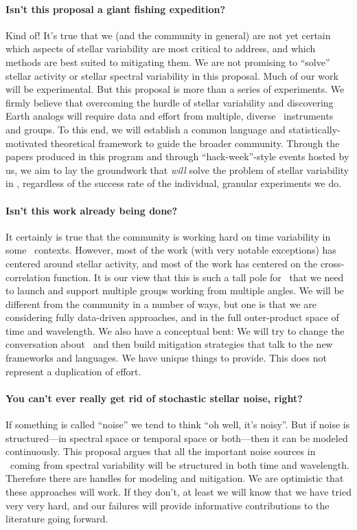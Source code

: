 \documentclass[12pt, letterpaper]{article}
\begin{document}
\paragraph{Isn't this proposal a giant fishing expedition?}
Kind of! It's true that we (and the community in general) are not yet certain 
which aspects of stellar variability are most critical to address, and which 
methods are best suited to mitigating them. We are not promising to 
``solve'' stellar activity or stellar spectral variability in this proposal.
Much of our work will be 
experimental. But this proposal is more than a series of experiments. 
We firmly believe that overcoming the hurdle of stellar variability and 
discovering Earth analogs will require data and effort from multiple, 
diverse \EPRV\ instruments and groups. To this end, we will establish 
a common language and statistically-motivated theoretical framework 
to guide the broader community. Through the papers produced in this 
program and through ``hack-week''-style events hosted by us, we aim to 
lay the groundwork that \textit{will} solve the problem of stellar variability 
in \EPRV, regardless of the success rate of the individual, granular experiments we do. 


\paragraph{Isn't this work already being done?}
It certainly is true that the community is working hard on time
variability in some \EPRV\ contexts.
However, most of the work (with very notable exceptions) has centered
around stellar activity, and most of the work has centered on the
cross-correlation function.
It is our view that this is such a tall pole for \EPRV\ that we need
to launch and support multiple groups working from multiple angles.
We will be different from the community in a number of ways, but one
is that we are considering fully data-driven approaches, and in the
full outer-product space of time and wavelength.
We also have a conceptual bent: We will try to change the conversation
about \EPRV\ and then build mitigation strategies that talk to the
new frameworks and languages.
We have unique things to provide.
This does not represent a duplication of effort.


\paragraph{You can't ever really get rid of stochastic stellar noise, right?}
If something is called ``noise'' we tend to think ``oh well, it's
noisy''. But if noise is structured---in spectral space or temporal
space or both---then it can be modeled continuously.
This proposal argues that all the important noise sources in \EPRV\ coming
from spectral variability will be structured in both time and wavelength.
Therefore there are handles for modeling and mitigation.
We are optimistic that these approaches will work.
If they don't, at least we will know that we have tried very very hard, 
and our failures will provide informative contributions to the 
literature going forward.
\end{document}
